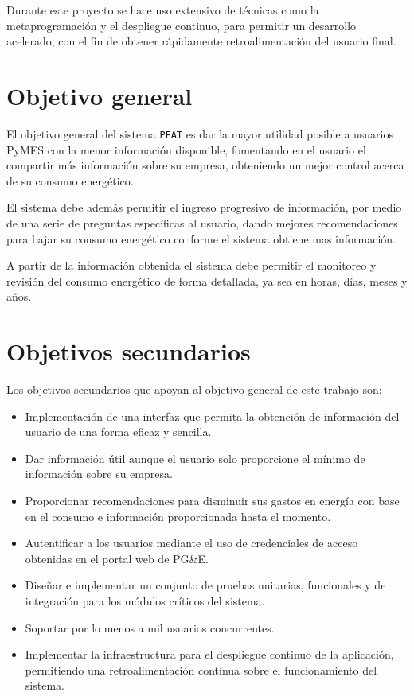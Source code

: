 Durante este proyecto se hace uso extensivo de técnicas como la metaprogramación
y el despliegue continuo, para permitir un desarrollo acelerado, con el fin de
obtener rápidamente retroalimentación del usuario final.

\section*{Objetivo general}

El objetivo general del sistema \texttt{PEAT} es dar la mayor utilidad posible
a usuarios PyMES con la menor información disponible, fomentando en el usuario
el compartir más información sobre su empresa, obteniendo un mejor control
acerca de su consumo energético.

El sistema debe además permitir el ingreso progresivo de información, por medio
de una serie de preguntas específicas al usuario, dando mejores recomendaciones
para bajar su consumo energético conforme el sistema obtiene mas información.

A partir de la información obtenida el sistema debe permitir el monitoreo
y revisión del consumo energético de forma detallada, ya sea en horas,
días, meses y años.

\section*{Objetivos secundarios}

Los objetivos secundarios que apoyan al objetivo general de este trabajo son:
\begin{itemize}
\item Implementación de una interfaz que permita la obtención
  de información del usuario de una forma eficaz y sencilla.
\item Dar información útil aunque el usuario solo proporcione el
  mínimo de información sobre su empresa.
\item Proporcionar recomendaciones para disminuir sus
  gastos en energía con base en el consumo e información proporcionada
  hasta el momento.
\item Autentificar a los usuarios mediante el uso de credenciales de acceso
  obtenidas en el portal web de PG\&E.
\item Diseñar e implementar un conjunto de pruebas unitarias, funcionales
  y de integración para los módulos críticos del sistema.
\item Soportar por lo menos a mil usuarios concurrentes.
\item Implementar la infraestructura para el despliegue continuo de la
  aplicación, permitiendo una retroalimentación contínua sobre el
  funcionamiento del sistema.
\end{itemize}

